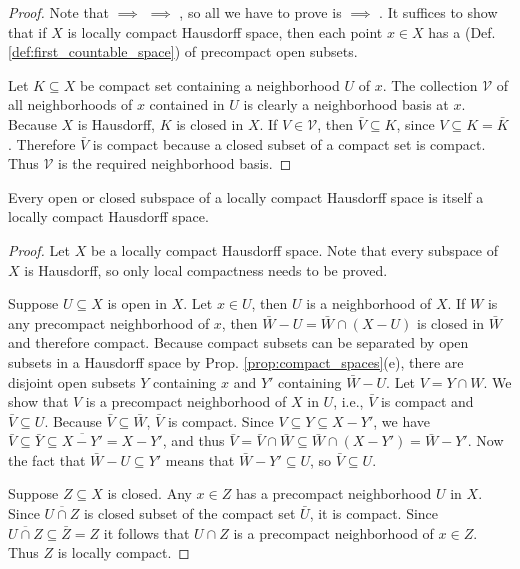 \documentclass[11pt,a4paper]{article}
\begin{document}
\begin{proof}
Note that $\implies$  $\implies$ , so all we have to prove is  $\implies$ . It suffices to show that if $X$ is locally compact Hausdorff space, then each point $x\in X$ has a  (Def. \ref{def:first_countable_space}) of precompact open subsets. 

Let $K\subseteq X$ be compact set containing a neighborhood $U$ of $x$. The collection $\mathcal{V}$ of all neighborhoods of $x$ contained in $U$ is clearly a neighborhood basis at $x$. Because $X$ is Hausdorff, $K$ is closed in $X$. If $V\in \mathcal{V}$, then $\bar{V}\subseteq K$, since $V\subseteq K = \bar{K}$. Therefore $\bar{V}$ is compact because a closed subset of a compact set is compact. Thus $\mathcal{V}$ is the required neighborhood basis.
\end{proof}

\begin{prop}
Every open or closed subspace of a locally compact Hausdorff space is itself a locally compact Hausdorff space.
\end{prop}

\begin{proof}
Let $X$ be a locally compact Hausdorff space. Note that every subspace of $X$ is Hausdorff, so only local compactness needs to be proved.

Suppose $U\subseteq X$ is open in $X$. Let $x\in U$, then $U$ is a neighborhood of $X$. If $W$ is any precompact neighborhood of $x$, then $\bar{W}-U = \bar{W}\cap (X - U)$ is closed in $\bar{W}$ and therefore compact. Because compact subsets can be separated by open subsets in a Hausdorff space by Prop. \ref{prop:compact_spaces}(e), there are disjoint open subsets $Y$ containing $x$ and $Y'$ containing $\bar{W}-U$. Let $V = Y\cap W$. We show that $V$ is a precompact neighborhood of $X$ in $U$, i.e., $\bar{V}$ is compact and $\bar{V}\subseteq U$. Because $\bar{V}\subseteq \bar{W}$, $\bar{V}$ is compact. Since $V\subseteq Y\subseteq X-Y'$, we have $\bar{V}\subseteq \bar{Y}\subseteq \overline{X-Y'} = X - Y'$, and thus $\bar{V} = \bar{V}\cap \bar{W}\subseteq \bar{W}\cap (X-Y') = \bar{W}-Y'$. Now the fact that $\bar{W}-U\subseteq Y'$ means that $\bar{W}-Y'\subseteq U$, so $\bar{V}\subseteq U$.

Suppose $Z\subseteq X$ is closed. Any $x\in Z$ has a precompact neighborhood $U$ in $X$. Since $\overline{U\cap Z}$ is closed subset of the compact set $\bar{U}$, it is compact. Since $\overline{U\cap Z}\subseteq \bar Z = Z$ it follows that $U\cap Z$ is a precompact neighborhood of $x\in Z$. Thus $Z$ is locally compact.
\end{proof}
\end{document}
